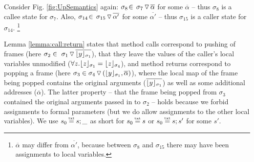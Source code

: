  

 Consider Fig. \ref{fig:UpSemantics} again: $\sigma_8\!\in\!   \PushS  {\alpha} {\sigma_7}$ for some $\overline \alpha$ -- {thus $\sigma_8$ is a callee state for 
 $\sigma_7$}. Also, 
 $\sigma_{14}\!\in\!\PushS  {\alpha'} {\sigma_{15}}$ for some $\overline {\alpha'}$ -- {thus $\sigma_{15}$ is a caller state for 
 $\sigma_{14}$}.
\footnote{ $\overline \alpha$ may differ from $\overline {\alpha'}$, because between $\sigma_8$ and $\sigma_{15}$ there may 
 have been assignments to local variables.} %
 
Lemma \ref{lemma:call:return}
states that method calls  correspond  to pushing of frames (here $\sigma_2 \in \PushS  {\interpret {\sigma_1} {y}} {\sigma_1}$),
 that they leave the values of the caller's local variables unmodified ($\forall z. \interpret {\sigma_1} {z} = \interpret {\sigma_4} {z}$), and
method returns  correspond  to popping  a frame  (here $\sigma_3 \in  \PushSLong  {( {\interpret {\sigma_1} {y}},{\overline \alpha})} {\sigma_4}$), where the local map of the frame being popped contains the original arguments ($\overline {{\interpret {\sigma_1} {y}}}$) as well as some additional addresses ($\overline \alpha$).
The latter property -- that  the frame being popped from $\sigma_3$ contained the original arguments passed in to $\sigma_2$ -- holds because 
 we forbid assignments to formal parameters (but we do allow  assignments to the other local variables).
 We use $s_0\txteq s;\_$ as short for $s_0\txteq s$  or  $s_0\txteq s;s'$ for some $s'$.

